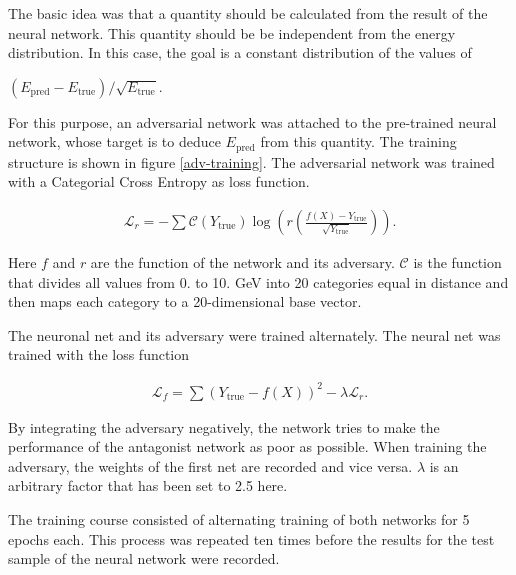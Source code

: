 \documentclass[12pt, a4paper]{thesis}
\begin{document}
The basic idea was that a quantity should be calculated from the
result of the neural network. This quantity should be be independent
from the energy distribution. In this case, the goal is a constant
distribution of the values of

\((E_{\text{pred}}-E_{\text{true}})/\sqrt{E_{\text{true}}}\).


For this purpose, an adversarial network was attached to the
pre-trained neural network, whose target is to deduce
\(E_{\text{pred}}\) from this quantity. The training structure is shown
in figure \ref{adv-training}. The adversarial network was trained
with a Categorial Cross Entropy as loss function.

\begin{align}
\mathcal{L}_r = - \sum \mathcal{C}\left(Y_{\text{true}}\right)
\log(r\left(\frac{f(X)-Y_{\text{true}}}{\sqrt{Y_{\text{true}}}}\right)).
\end{align}

Here \(f\) and \(r\) are the function of the network and its
adversary. \(\mathcal{C}\) is the function that divides all values
from 0. to 10. GeV into 20 categories equal in distance and then maps
each category to a 20-dimensional base vector.

The neuronal net and its adversary were trained alternately. The
neural net was trained with the loss function

\begin{align}
\mathcal{L}_f = \sum (Y_{\text{true}} - f(X))^2 - \lambda
\mathcal{L}_r.
\end{align}

By integrating the adversary negatively, the network tries to make the
performance of the antagonist network as poor as possible. When
training the adversary, the weights of the first net are recorded and
vice versa. \(\lambda\) is an arbitrary factor that has been set to 2.5
here. 

The training course consisted of alternating training of both networks
for 5 epochs each. This process was repeated ten times before the
results for the test sample of the neural network were recorded.
\end{document}
